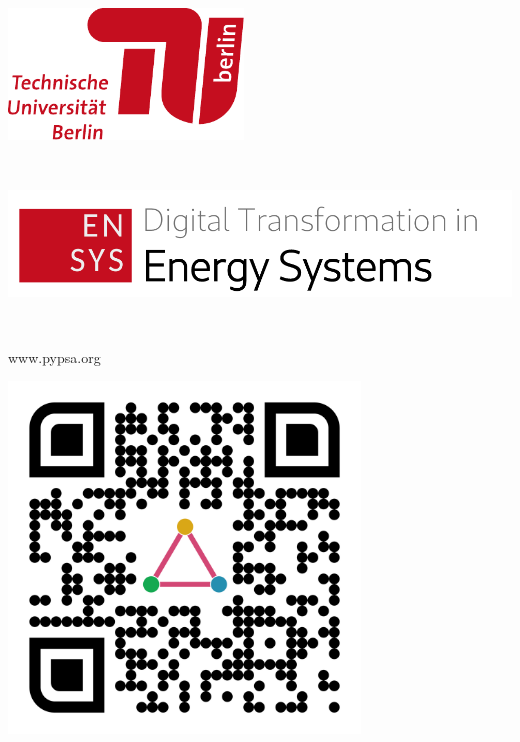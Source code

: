 \documentclass[a0,portrait]{a0poster}
\begin{document}
\noindent
\begin{minipage}[b][2cm][t]{0.74\linewidth} 
  \vspace{1em}
  \begin{minipage}{0.15\textwidth}
    \includegraphics[height=3.5cm]{tub-logo.pdf}
  \end{minipage}
  \begin{minipage}{0.2\textwidth}
    \includegraphics[height=4.5cm]{ensys-logo-en.pdf}
  \end{minipage}
  \vspace{6em}

  \begin{minipage}{1\textwidth}
    \makeatletter
    \raggedright{\fontsize{80pt}{100pt}\selectfont\color{red100}\textbf{{\@title}}\par}
    \makeatother
    \color{Black}
    \vspace{0.2cm}
    \hspace{0.005em}
    www.pypsa.org
  \end{minipage}
\end{minipage}%
%
\begin{minipage}[b][2cm][t]{0.25\linewidth} %
  \includegraphics[width=0.7\textwidth]{qr-code.png} %
\end{minipage}
\end{document}
